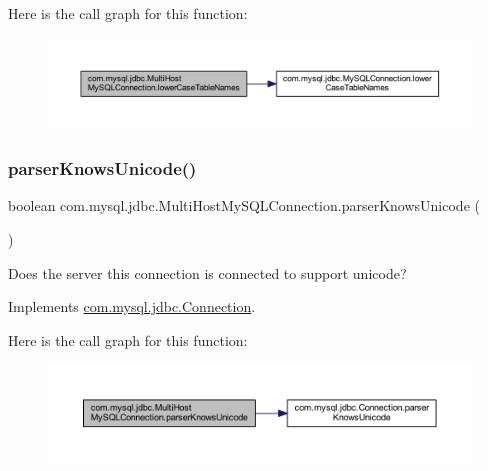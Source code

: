Here is the call graph for this function\+:
\nopagebreak
\begin{figure}[H]
\begin{center}
\leavevmode
\includegraphics[width=350pt]{classcom_1_1mysql_1_1jdbc_1_1_multi_host_my_s_q_l_connection_a0d35ab03e1820d4895d11f35d7b9a9ac_cgraph}
\end{center}
\end{figure}
\mbox{\label{classcom_1_1mysql_1_1jdbc_1_1_multi_host_my_s_q_l_connection_a3a325a2e459d6fcda172893f843c390d}} 
\subsubsection{\texorpdfstring{parser\+Knows\+Unicode()}{parserKnowsUnicode()}}
{\footnotesize\ttfamily boolean com.\+mysql.\+jdbc.\+Multi\+Host\+My\+S\+Q\+L\+Connection.\+parser\+Knows\+Unicode (\begin{DoxyParamCaption}{ }\end{DoxyParamCaption})}

Does the server this connection is connected to support unicode? 

Implements \mbox{\hyperlink{interfacecom_1_1mysql_1_1jdbc_1_1_connection_a09e06dca89e57de8d11e9e9ff2d78f4d}{com.\+mysql.\+jdbc.\+Connection}}.

Here is the call graph for this function\+:
\nopagebreak
\begin{figure}[H]
\begin{center}
\leavevmode
\includegraphics[width=350pt]{classcom_1_1mysql_1_1jdbc_1_1_multi_host_my_s_q_l_connection_a3a325a2e459d6fcda172893f843c390d_cgraph}
\end{center}
\end{figure}
\mbox{\label{classcom_1_1mysql_1_1jdbc_1_1_multi_host_my_s_q_l_connection_a636155352e7bad08773dd608f858676c}} 
